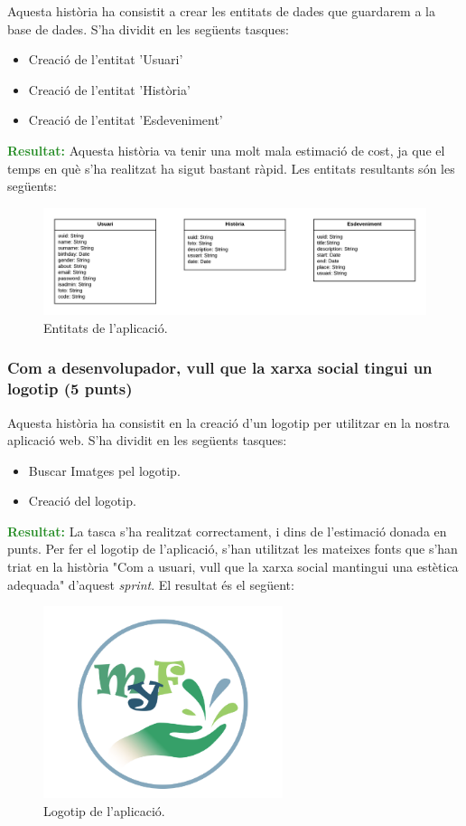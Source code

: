 \documentclass[11pt,catalan,listoffigures,listoftables]{tfgetsinf}
\begin{document}
Aquesta història ha consistit a crear les entitats de dades que guardarem a la base de dades. S'ha dividit en les següents tasques:
\begin{itemize}
\item Creació de l'entitat 'Usuari'
\item Creació de l'entitat 'Història'
\item Creació de l'entitat 'Esdeveniment'
\end{itemize}
\textcolor{forestgreen}{\textbf{Resultat:}} Aquesta història va tenir una molt mala estimació de cost, ja que el temps en què s'ha realitzat ha sigut bastant ràpid. Les entitats resultants són les següents:

\begin{figure}[h]
\includegraphics[width=15cm]{images/image6}
\centering
\caption[Figura 3.2]{Entitats de l'aplicació.}
\centering
\end{figure}

\subsubsection{Com a desenvolupador, vull que la xarxa social tingui un logotip (5 punts)}

Aquesta història ha consistit en la creació d'un logotip per utilitzar en la nostra aplicació web. S'ha dividit en les següents tasques:
\begin{itemize}
\item Buscar Imatges pel logotip.
\item Creació del logotip.
\end{itemize}
\textcolor{forestgreen}{\textbf{Resultat:}} La tasca s'ha realitzat correctament, i dins de l'estimació donada en punts. Per fer el logotip de l'aplicació, s'han utilitzat les mateixes fonts que s'han triat en la història "Com a usuari, vull que la xarxa social mantingui una estètica adequada" d'aquest \textit{sprint}.
El resultat és el següent:

\begin{figure}[H]
\includegraphics[width=7cm]{images/image3}
\centering
\caption[Figura 3.3]{Logotip de l'aplicació.}
\centering
\end{figure}
\end{document}
